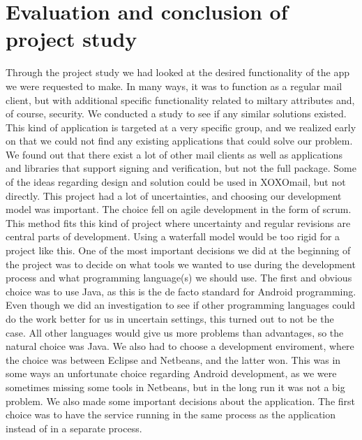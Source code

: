 \pagebreak
\section{Evaluation and conclusion of project study}\label{sec:evalconc}
Through the project study we had looked at the desired functionality of the app we were requested to make. In many ways, it was to function as a regular mail client, but with additional specific functionality related to miltary attributes and, of course, security. We conducted a study to see if any similar solutions existed. This kind of application is targeted at a very specific group, and we realized early on that we could not find any existing applications that could solve our problem. We found out that there exist a lot of other mail clients as well as applications and libraries that support signing and verification, but not the full package. Some of the ideas regarding design and solution could be used in XOXOmail, but not directly.
\newline\newline
This project had a lot of uncertainties, and choosing our development model was important. The choice fell on agile development in the form of scrum. This method fits this kind of project where uncertainty and regular revisions are central parts of development. Using a waterfall model would be too rigid for a project like this.
\newline\newline
One of the most important decisions we did at the beginning of the project was to decide on what tools we wanted to use during the development process and what programming language(s) we should use. The first and obvious choice was to use Java, as this is the de facto standard for Android programming. Even though we did an investigation to see if other programming languages could do the work better for us in uncertain settings, this turned out to not be the case. All other languages would give us more problems than advantages, so the natural choice was Java. We also had to choose a development enviroment, where the choice was between Eclipse and Netbeans, and the latter won.  This was in some ways an unfortunate choice regarding Android development, as we were sometimes missing some tools in Netbeans, but in the long run it was not a big problem.
\newline\newline
We also made some important decisions about the application. The first choice was to have the service running in the same process as the application instead of in a separate process.%
